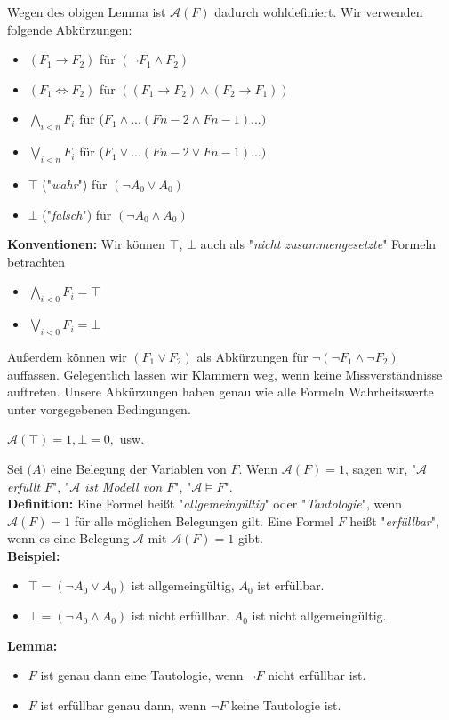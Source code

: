 \documentclass{scrartcl}
\begin{document}
Wegen des obigen Lemma ist $\mathcal{A}(F)$ dadurch wohldefiniert. Wir verwenden folgende Abk\"urzungen:
\begin{itemize}
\item $(F_1 \rightarrow F_2)$ f\"ur $(\neg F_1 \wedge F_2)$
\item $(F_1 \Leftrightarrow F_2)$ f\"ur $((F_1 \rightarrow F_2) \wedge (F_2 \rightarrow F_1))$
\item $\bigwedge_{i < n}{F_i}$ f\"ur ($F_1 \wedge ... (F{n-2} \wedge F{n-1}) ... )$
\item $\bigvee_{i < n}{F_i}$ f\"ur ($F_1 \vee ... (F{n-2} \vee F{n-1}) ... )$
\item $\top$ ("\textit{wahr}") f\"ur $(\neg A_0 \vee A_0)$
\item $\bot$ ("\textit{falsch}") f\"ur $(\neg A_0 \wedge A_0)$
\end{itemize}
\textbf{Konventionen:} Wir k\"onnen $\top$, $\bot$ auch als "\textit{nicht zusammengesetzte}" Formeln betrachten
\begin{itemize}
\item $\bigwedge_{i < 0}{F_i} = \top$
\item $\bigvee_{i < 0}{F_i} = \bot$
\end{itemize}
Au{\ss}erdem k\"onnen wir $(F_1 \vee F_2)$ als Abk\"urzungen f\"ur $\neg(\neg F_1 \wedge \neg F_2)$ auffassen. Gelegentlich lassen wir Klammern weg, wenn keine Missverst\"andnisse auftreten. Unsere Abk\"urzungen haben genau wie alle Formeln Wahrheitswerte unter vorgegebenen Bedingungen.\\
\begin{center}
$\mathcal{A}(\top) = 1, \mathcal{\bot} = 0,$ usw.
\end{center}
Sei $\mathcal(A)$ eine Belegung der Variablen von $F$. Wenn $\mathcal{A}(F) = 1$, sagen wir, "\textit{$\mathcal{A}$ erf\"ullt $F$}", "\textit{$\mathcal{A}$ ist Modell von $F$}", "\textit{$\mathcal{A} \models F$}".\\
\textbf{Definition:} Eine Formel hei{\ss}t "\textit{allgemeing\"ultig}" oder "\textit{Tautologie}", wenn $\mathcal{A}(F) = 1$ f\"ur alle m\"oglichen Belegungen gilt. Eine Formel $F$ hei{\ss}t "\textit{erf\"ullbar}", wenn es eine Belegung $\mathcal{A}$ mit $\mathcal{A}(F) = 1$ gibt.\\
\textbf{Beispiel:}
\begin{itemize}
\item $\top = (\neg A_0 \vee A_0)$ ist allgemeing\"ultig, $A_0$ ist erf\"ullbar.
\item $\bot = (\neg A_0 \wedge A_0)$ ist nicht erf\"ullbar. $A_0$ ist nicht allgemeing\"ultig.
\end{itemize}
\textbf{Lemma:} 
\begin{itemize}
\item $F$ ist genau dann eine Tautologie, wenn $\neg F$ nicht erf\"ullbar ist.
\item $F$ ist erf\"ullbar genau dann, wenn $\neg F$ keine Tautologie ist.
\end{itemize}
\end{document}
